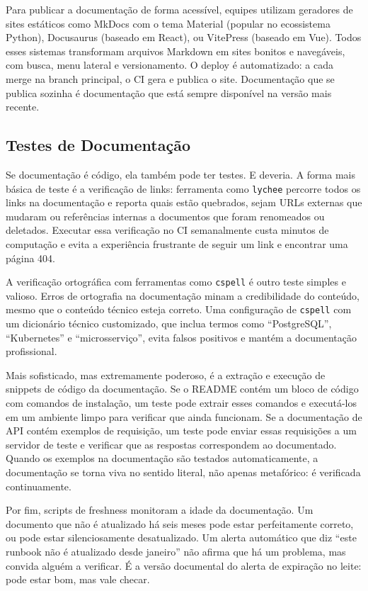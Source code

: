 Para publicar a documentação de forma acessível, equipes utilizam
geradores de sites estáticos como MkDocs com o tema Material (popular
no ecossistema Python), Docusaurus (baseado em React), ou VitePress
(baseado em Vue). Todos esses sistemas transformam arquivos Markdown em
sites bonitos e navegáveis, com busca, menu lateral e versionamento.
O deploy é automatizado: a cada merge na branch principal, o CI gera
e publica o site. Documentação que se publica sozinha é documentação
que está sempre disponível na versão mais recente.


\subsection{Testes de Documentação}

Se documentação é código, ela também pode ter testes. E deveria. A
forma mais básica de teste é a verificação de links: ferramenta como
\texttt{lychee} percorre todos os links na documentação e reporta quais
estão quebrados, sejam URLs externas que mudaram ou referências internas a
documentos que foram renomeados ou deletados. Executar essa verificação
no CI semanalmente custa minutos de computação e evita a experiência
frustrante de seguir um link e encontrar uma página 404.

A verificação ortográfica com ferramentas como \texttt{cspell} é outro
teste simples e valioso. Erros de ortografia na documentação minam a
credibilidade do conteúdo, mesmo que o conteúdo técnico esteja correto.
Uma configuração de \texttt{cspell} com um dicionário técnico
customizado, que inclua termos como ``PostgreSQL'', ``Kubernetes'' e
``microsserviço'', evita falsos positivos e mantém a documentação
profissional.

Mais sofisticado, mas extremamente poderoso, é a extração e execução
de snippets de código da documentação. Se o README contém um bloco de
código com comandos de instalação, um teste pode extrair esses comandos
e executá-los em um ambiente limpo para verificar que ainda funcionam.
Se a documentação de API contém exemplos de requisição, um teste pode
enviar essas requisições a um servidor de teste e verificar que as
respostas correspondem ao documentado. Quando os exemplos na
documentação são testados automaticamente, a documentação se torna
viva no sentido literal, não apenas metafórico: é verificada continuamente.

Por fim, scripts de freshness monitoram a idade da documentação.
Um documento que não é atualizado há seis meses pode estar
perfeitamente correto, ou pode estar silenciosamente desatualizado.
Um alerta automático que diz ``este runbook não é atualizado desde
janeiro'' não afirma que há um problema, mas convida alguém a verificar.
É a versão documental do alerta de expiração no leite: pode estar bom,
mas vale checar.


